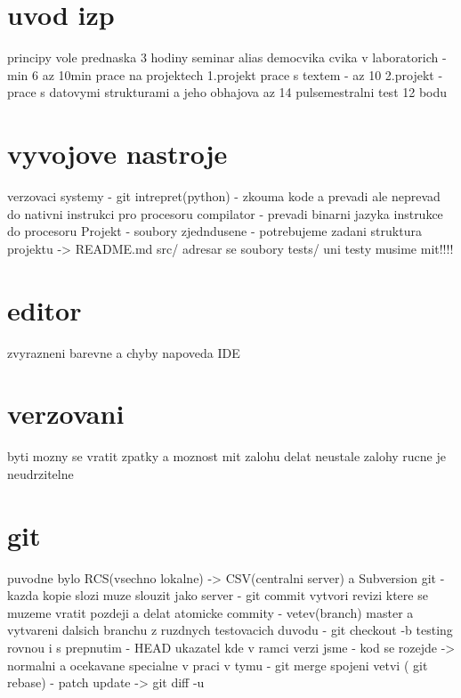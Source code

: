 \documentclass{article}
\begin{document}
\section{uvod izp}
principy vole
prednaska 3 hodiny
seminar alias democvika
cvika v laboratorich - min 6 az 10min
prace na projektech
1.projekt prace s textem - az 10
2.projekt - prace s datovymi strukturami a jeho obhajova az 14
pulsemestralni test 12 bodu
\section{vyvojove nastroje}
verzovaci systemy - git
intrepret(python) - zkouma kode a prevadi  ale neprevad do nativni  instrukci pro procesoru
compilator - prevadi binarni jazyka instrukce do procesoru
Projekt - soubory zjedndusene - potrebujeme zadani
struktura projektu -> README.md
                      src/ adresar se soubory
                      tests/ uni testy musime mit!!!!
\section{editor}
zvyrazneni barevne a chyby
napoveda
IDE
\section{verzovani}
byti mozny se vratit zpatky a moznost mit zalohu
delat neustale zalohy rucne je neudrzitelne
\section{git}
puvodne bylo RCS(vsechno lokalne) -> CSV(centralni server) a Subversion
git - kazda kopie slozi muze slouzit jako server
    - git commit vytvori revizi ktere se muzeme vratit pozdeji a delat atomicke
    commity
    - vetev(branch) master a vytvareni dalsich branchu z ruzdnych testovacich
    duvodu - git checkout -b testing rovnou i s prepnutim
    - HEAD ukazatel kde v ramci verzi jsme
    - kod se rozejde -> normalni a ocekavane specialne v praci v tymu
    - git merge spojeni vetvi ( git rebase)
    - patch update -> git diff -u
\end{document}
